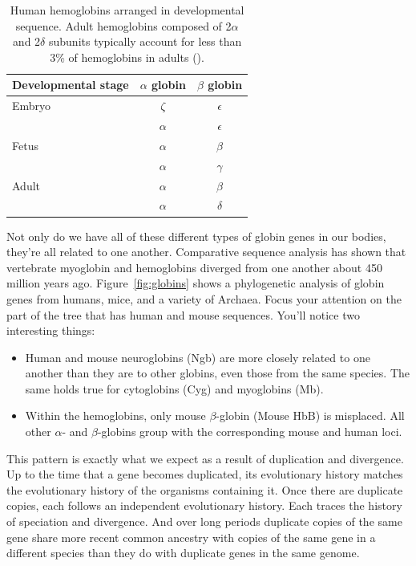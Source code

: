 \begin{table}
\begin{center}
\begin{tabular}{l|cc}
\hline\hline
Developmental stage & $\alpha$ globin & $\beta$ globin \\
\hline
Embryo & $\zeta$  & $\epsilon$ \\
       & $\alpha$ & $\epsilon$ \\
Fetus  & $\alpha$ & $\beta$ \\
       & $\alpha$  & $\gamma$ \\
Adult  & $\alpha$ & $\beta$ \\
       & $\alpha$ & $\delta$ \\
\hline
\end{tabular}
\end{center}
\caption{Human hemoglobins arranged in developmental sequence. Adult
  hemoglobins composed of 2$\alpha$ and 2$\delta$ subunits typically
  account for less than 3\% of hemoglobins in adults ().}\label{table:globins}
\end{table}

Not only do we have all of these different types of globin genes in
our bodies, they're all related to one another. Comparative sequence
analysis has shown that vertebrate myoglobin and hemoglobins diverged
from one another about 450 million years ago. Figure~\ref{fig:globins}
shows a phylogenetic analysis of globin genes from humans, mice, and a
variety of Archaea. Focus your attention on the part of the tree that
has human and mouse sequences. You'll notice two interesting
things:

\begin{itemize}

\item Human and mouse neuroglobins (Ngb) are more closely related to
  one another than they are to other globins, even those from the same
  species. The same holds true for cytoglobins (Cyg) and myoglobins
  (Mb).

\item Within the hemoglobins, only mouse $\beta$-globin (Mouse HbB) is
  misplaced. All other $\alpha$- and $\beta$-globins group with the
  corresponding mouse and human loci.

\end{itemize}

This pattern is exactly what we expect as a result of duplication and
divergence. Up to the time that a gene becomes duplicated, its
evolutionary history matches the evolutionary history of the organisms
containing it. Once there are duplicate copies, each follows an
independent evolutionary history. Each traces the history of
speciation and divergence. And over long periods duplicate copies of
the same gene share more recent common ancestry with copies of the
same gene in a different species than they do with duplicate genes in
the same genome.

